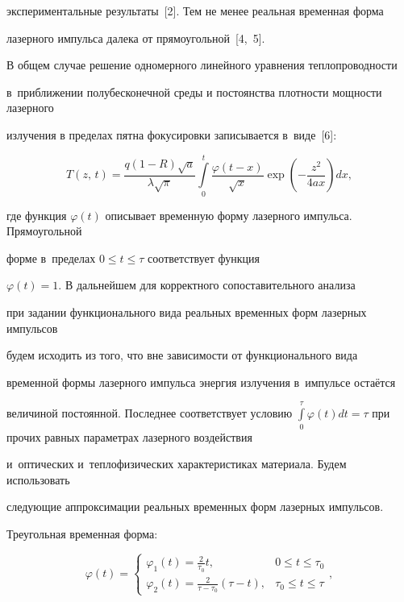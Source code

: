 экспериментальные результаты~[2]. Тем не менее реальная временная форма 

лазерного импульса далека от прямоугольной~[4,~5].



В общем случае решение одномерного линейного уравнения теплопроводности 

в~приближении полубесконечной среды и постоянства плотности мощности лазерного 

излучения в пределах пятна фокусировки записывается в~виде~[6]:

\begin{equation}

\label{gurevs:eq2}

T(z,\, t) = \frac{q(1 - R)\sqrt a }{\lambda \sqrt \pi }\int\limits_0^t \frac{\varphi 

(t - x)}{\sqrt{x}}\exp \left( { - \frac{z^2}{4ax}} \right)dx ,

\end{equation}

где функция $\varphi (t)$ описывает временную форму лазерного импульса. Прямоугольной 

форме в~пределах $0 \leqslant t \leqslant \tau $ соответствует функция 

$\varphi (t) = 1$. В дальнейшем для корректного сопоставительного анализа 

при задании функционального вида реальных временных форм лазерных импульсов 

будем исходить из того, что вне зависимости от функционального вида 

временной формы лазерного импульса энергия излучения в~импульсе остаётся 

величиной постоянной. Последнее соответствует условию $\int\limits_0^\tau 

{\varphi (t)dt} = \tau $ при прочих равных параметрах лазерного воздействия 

и~оптических и~теплофизических характеристиках материала. Будем использовать 

следующие аппроксимации реальных временных форм лазерных импульсов.



Треугольная временная форма:

\begin{equation}

\label{gurevs:eq3}

\varphi (t) = \left\{ {\begin{array}{ll}

 \varphi _1 (t) = \frac{2}{\tau _0 }t, & 0 \leqslant t \leqslant \tau _0 

\\ 

 \varphi _2 (t) = \frac{2}{\tau - \tau _0 }\left( {\tau - t} 

\right), & \tau _0 \leqslant t \leqslant \tau 

 \end{array}} \right.,

\end{equation}

